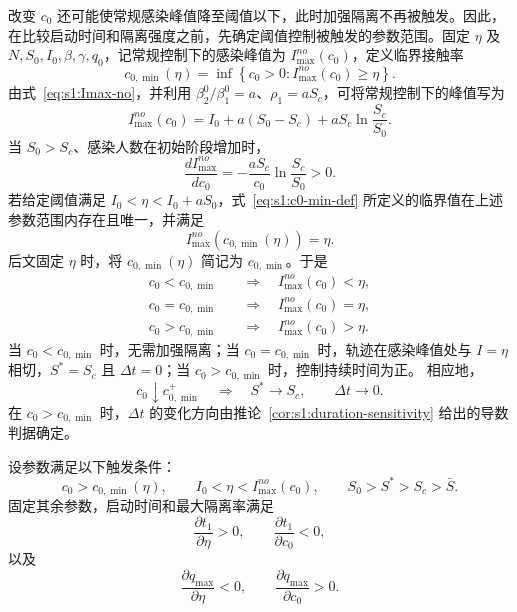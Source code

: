 \documentclass[lang=cn,a4paper,newtx]{elegantpaper}
\numberwithin{equation}{section}
\theoremstyle{plain}
\begin{document}
改变 $c_0$ 还可能使常规感染峰值降至阈值以下，此时加强隔离不再被触发。因此，在比较启动时间和隔离强度之前，先确定阈值控制被触发的参数范围。固定 $\eta$ 及 $N,S_0,I_0,\beta,\gamma,q_0$，记常规控制下的感染峰值为 $I_{\max}^{no}(c_0)$，定义临界接触率
\begin{equation}
c_{0,\min}(\eta)
=
\inf\left\{
c_0>0:
I_{\max}^{no}(c_0)\geq \eta
\right\}.
\label{eq:s1:c0-min-def}
\end{equation}
由式~\eqref{eq:s1:Imax-no}，并利用
$\beta_2^0/\beta_1^0=a$、$\rho_1=aS_c$，可将常规控制下的峰值写为
\begin{equation}
I_{\max}^{no}(c_0)
=
I_0+a(S_0-S_c)+aS_c\ln\frac{S_c}{S_0}.
\label{eq:s1:Imax-no-c0}
\end{equation}
当 $S_0>S_c$、感染人数在初始阶段增加时，
\begin{equation}
\frac{d I_{\max}^{no}}{dc_0}
=
-\frac{aS_c}{c_0}\ln\frac{S_c}{S_0}>0.
\label{eq:s1:Imax-no-c0-derivative}
\end{equation}
若给定阈值满足
$I_0<\eta<I_0+aS_0$，式~\eqref{eq:s1:c0-min-def} 所定义的临界值在上述参数范围内存在且唯一，并满足
\begin{equation}
I_{\max}^{no}\!\left(c_{0,\min}(\eta)\right)=\eta.
\label{eq:s1:c0-min-equality}
\end{equation}
后文固定 $\eta$ 时，将 $c_{0,\min}(\eta)$ 简记为 $c_{0,\min}$。于是
\begin{equation}
\begin{aligned}
c_0<c_{0,\min}
&\quad\Longrightarrow\quad I_{\max}^{no}(c_0)<\eta,\\
c_0=c_{0,\min}
&\quad\Longrightarrow\quad I_{\max}^{no}(c_0)=\eta,\\
c_0>c_{0,\min}
&\quad\Longrightarrow\quad I_{\max}^{no}(c_0)>\eta.
\end{aligned}
\label{eq:s1:c0-min-regimes}
\end{equation}
当 $c_0<c_{0,\min}$ 时，无需加强隔离；当 $c_0=c_{0,\min}$ 时，轨迹在感染峰值处与 $I=\eta$ 相切，$S^*=S_c$ 且 $\Delta t=0$；当 $c_0>c_{0,\min}$ 时，控制持续时间为正。
相应地，
\begin{equation}
c_0\downarrow c_{0,\min}^{+}
\quad\Longrightarrow\quad
S^*\to S_c,
\qquad
\Delta t\to0.
\label{eq:s1:c0-min-limit}
\end{equation}
在 $c_0>c_{0,\min}$ 时，$\Delta t$ 的变化方向由推论~\ref{cor:s1:duration-sensitivity} 给出的导数判据确定。

\begin{proposition}
\label{prop:s1:sensitivity}
设参数满足以下触发条件：
\[
c_0>c_{0,\min}(\eta),
\qquad
I_0<\eta<I_{\max}^{no}(c_0),
\qquad
S_0>S^*>S_c>\bar S.
\]
固定其余参数，启动时间和最大隔离率满足
\[
\frac{\partial t_1}{\partial \eta}>0,
\qquad
\frac{\partial t_1}{\partial c_0}<0,
\]
以及
\[
\frac{\partial q_{\max}}{\partial \eta}<0,
\qquad
\frac{\partial q_{\max}}{\partial c_0}>0.
\]
\end{proposition}
\end{document}
